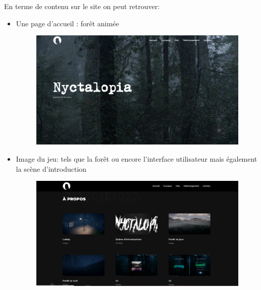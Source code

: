 \noindent En terme de contenu sur le site on peut retrouver:
\begin{itemize}
    \item Une page d'accueil : forêt animée
    
\begin{figure}[H]
\centering
\begin{minipage}{.5\textwidth}
  \centering
  \centerline{\includegraphics[width=1\linewidth]{img/acceuil.PNG}}
  \label{fig:accueil}
\end{minipage}%
\end{figure}    
    
    \item Image du jeu: tels que la forêt ou encore l'interface utilisateur mais également la scène d'introduction
    
\begin{figure}[H]
\centering
\begin{minipage}{.5\textwidth}
  \centering
  \centerline{\includegraphics[width=1\linewidth]{img/propos.PNG}}
  \label{fig:imggame}
\end{minipage}%
\end{figure}

\end{itemize}

